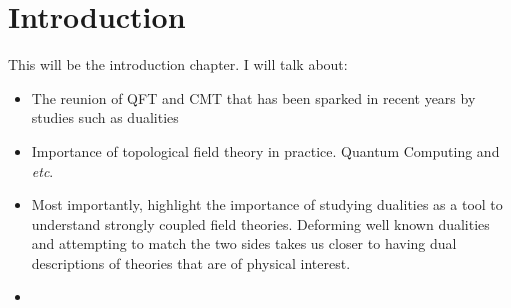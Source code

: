 
    \graphicspath{{Introduction_Folder/figures/PNG/}{Introduction_Folder/figures/PDF/}{Introduction_Folder/figures/}}

\chapter{Introduction}

This will be the introduction chapter. I will talk about:



\begin{itemize}
    \item The reunion of QFT and CMT that has been sparked in recent years by studies such as dualities
    \item Importance of topological field theory in practice. Quantum Computing and \textit{etc}. 
    \item Most importantly, highlight the importance of studying dualities as a tool to understand strongly coupled field theories. Deforming well known dualities and attempting to match the two sides takes us closer to having dual descriptions of theories that are of physical interest.
    \item 
\end{itemize}
